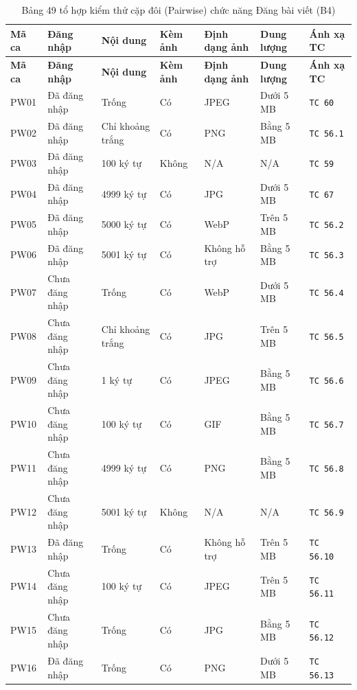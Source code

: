 \documentclass[11pt,a4paper]{article}
\begin{document}
\begin{longtable}{|C{1.2cm}|L{2.4cm}|L{2.6cm}|C{1.6cm}|L{2.5cm}|L{2.2cm}|C{2.0cm}|}
\hline
{}
\textbf{Mã ca} & \textbf{Đăng nhập} & \textbf{Nội dung} & \textbf{Kèm ảnh} & \textbf{Định dạng ảnh} & \textbf{Dung lượng} & \textbf{Ánh xạ TC} \tabularnewline
\hline
\endfirsthead
\hline
{}
\textbf{Mã ca} & \textbf{Đăng nhập} & \textbf{Nội dung} & \textbf{Kèm ảnh} & \textbf{Định dạng ảnh} & \textbf{Dung lượng} & \textbf{Ánh xạ TC} \tabularnewline
\hline
\endhead
\hline
\endfoot
\hline
\caption{Bảng 49 tổ hợp kiểm thử cặp đôi (Pairwise) chức năng Đăng bài viết (B4)}
\endlastfoot
PW01 & Đã đăng nhập & Trống & Có & JPEG & Dưới 5 MB & \texttt{TC 60} \\ \hline
PW02 & Đã đăng nhập & Chỉ khoảng trắng & Có & PNG & Bằng 5 MB & \texttt{TC 56.1} \\ \hline
PW03 & Đã đăng nhập & 100 ký tự & Không & N/A & N/A & \texttt{TC 59} \\ \hline
PW04 & Đã đăng nhập & 4999 ký tự & Có & JPG & Dưới 5 MB & \texttt{TC 67} \\ \hline
PW05 & Đã đăng nhập & 5000 ký tự & Có & WebP & Trên 5 MB & \texttt{TC 56.2} \\ \hline
PW06 & Đã đăng nhập & 5001 ký tự & Có & Không hỗ trợ & Bằng 5 MB & \texttt{TC 56.3} \\ \hline
PW07 & Chưa đăng nhập & Trống & Có & WebP & Dưới 5 MB & \texttt{TC 56.4} \\ \hline
PW08 & Chưa đăng nhập & Chỉ khoảng trắng & Có & JPG & Trên 5 MB & \texttt{TC 56.5} \\ \hline
PW09 & Chưa đăng nhập & 1 ký tự & Có & JPEG & Bằng 5 MB & \texttt{TC 56.6} \\ \hline
PW10 & Chưa đăng nhập & 100 ký tự & Có & GIF & Bằng 5 MB & \texttt{TC 56.7} \\ \hline
PW11 & Chưa đăng nhập & 4999 ký tự & Có & PNG & Bằng 5 MB & \texttt{TC 56.8} \\ \hline
PW12 & Chưa đăng nhập & 5001 ký tự & Không & N/A & N/A & \texttt{TC 56.9} \\ \hline
PW13 & Đã đăng nhập & Trống & Có & Không hỗ trợ & Trên 5 MB & \texttt{TC 56.10} \\ \hline
PW14 & Chưa đăng nhập & 100 ký tự & Có & JPEG & Trên 5 MB & \texttt{TC 56.11} \\ \hline
PW15 & Chưa đăng nhập & Trống & Có & JPG & Bằng 5 MB & \texttt{TC 56.12} \\ \hline
PW16 & Đã đăng nhập & Trống & Có & PNG & Dưới 5 MB & \texttt{TC 56.13} \\ \hline

\end{longtable}
\end{document}

